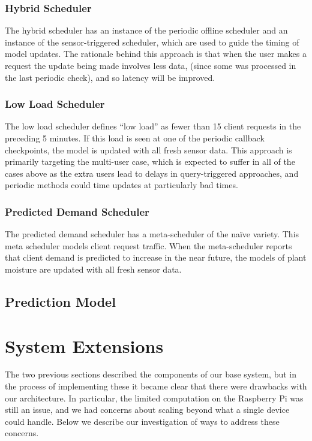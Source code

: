\documentclass[a4paper]{acm_proc_article-sp}
\makeatletter
\newcommand{\naive}{na\"{i}ve\@\xspace}
\makeatother
\begin{document}
\subsubsection{Hybrid Scheduler}

The hybrid scheduler has an instance of the periodic offline scheduler and an instance of the sensor-triggered scheduler, which are used to guide the timing of model updates.  The rationale behind this approach is that when the user makes a request the update being made involves less data, (since some was processed in the last periodic check), and so latency will be improved.

\subsubsection{Low Load Scheduler}

The low load scheduler defines ``low load'' as fewer than 15 client requests in the preceding 5 minutes.  If this load is seen at one of the periodic callback checkpoints, the model is updated with all fresh sensor data.  This approach is primarily targeting the multi-user case, which is expected to suffer in all of the cases above as the extra users lead to delays in query-triggered approaches, and periodic methods could time updates at particularly bad times.

\subsubsection{Predicted Demand Scheduler}

The predicted demand scheduler has a meta-scheduler of the \naive variety.  This meta scheduler models client request traffic.  When the meta-scheduler reports that client demand is predicted to increase in the near future, the models of plant moisture are updated with all fresh sensor data.

\subsection{Prediction Model}

\section{System Extensions}

The two previous sections described the components of our base system, but in the process of implementing these it became clear that there were drawbacks with our architecture.  In particular, the limited computation on the Raspberry Pi was still an issue, and we had concerns about scaling beyond what a single device could handle.  Below we describe our investigation of ways to address these concerns.
\end{document}

